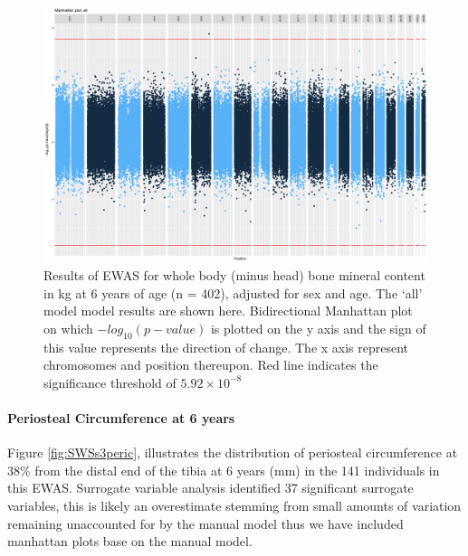 \documentclass[
]{book}
\begin{document}
\begin{figure}

{\centering \includegraphics[width=0.8\linewidth]{figs/SWSstotbmcwhasaEPICewasManhattanAll} 

}

\caption{Results of EWAS for whole body (minus head) bone mineral content in kg at 6 years of age (n = 402), adjusted for sex and age. The `all' model model results are shown here. Bidirectional Manhattan plot on which \(-log_{10}(p-value)\) is plotted on the y axis and the sign of this value represents the direction of change. The x axis represent chromosomes and position thereupon. Red line indicates the significance threshold of \(5.92\times10^{-8}\)}\label{fig:SWSstotbmcwhasaEPICewasManhattanSVA}
\end{figure}



\hypertarget{periosteal-circumference-at-6-years}{%
\paragraph{Periosteal Circumference at 6 years}\label{periosteal-circumference-at-6-years}}

Figure \ref{fig:SWSs3peric}, illustrates the distribution of periosteal circumference at 38\% from the distal end of the tibia at 6 years (mm) in the 141 individuals in this EWAS.
Surrogate variable analysis identified 37 significant surrogate variables, this is likely an overestimate stemming from small amounts of variation remaining unaccounted for by the manual model thus we have included manhattan plots base on the manual model.
\end{document}
